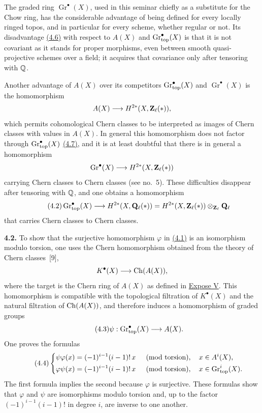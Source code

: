 The graded ring $\operatorname{Gr}^\bullet(X)$, used in this seminar chiefly
as a substitute for the Chow ring, has the considerable advantage of being
defined for every locally ringed topos, and in particular for every scheme,
whether regular or not. Its disadvantage \hyperlink{sga6.e14.para.4-6}{(4.6)} with respect to $A(X)$ and
$\operatorname{Gr}_{\mathrm{top}}^\bullet(X)$ is that it is not covariant as it stands for proper
morphisms, even between smooth quasi-projective schemes over a field; it
acquires that covariance only after tensoring with $\mathbb Q$.

Another advantage of $A(X)$ over its competitors $\operatorname{Gr}_{\mathrm{top}}^\bullet(X)$ and
$\operatorname{Gr}^\bullet(X)$ is the homomorphism
\[
 A(X)\longrightarrow H^{2*}(X,\mathbf Z_\ell(*)),
\]
which permits cohomological Chern classes to be interpreted as images of
Chern classes with values in $A(X)$. In general this homomorphism does not
factor through $\operatorname{Gr}_{\mathrm{top}}^\bullet(X)$ \hyperlink{sga6.e14.para.4-7}{(4.7)}, and it is at least doubtful that
there is in general a homomorphism
\[
 \operatorname{Gr}^\bullet(X)\longrightarrow H^{2*}(X,\mathbf Z_\ell(*))
\]
carrying Chern classes to Chern classes (see no.~5). These difficulties
disappear after tensoring with $\mathbb Q$, and one obtains a homomorphism
\begin{equation*}\tag{4.2}
 \operatorname{Gr}_{\mathrm{top}}^\bullet(X)\longrightarrow H^{2*}(X,\mathbf Q_\ell(*))
 =H^{2*}(X,\mathbf Z_\ell(*))\otimes_{\mathbf Z_\ell}\mathbf Q_\ell
\end{equation*}
that carries Chern classes to Chern classes.

\noindent{}\textbf{4.2.}
To show that the surjective homomorphism $\varphi$ in \hyperlink{sga6.e14.eq.4-1}{(4.1)} is an
isomorphism modulo torsion, one uses the Chern homomorphism obtained from the
theory of Chern classes~[9],
\[
 K^\bullet(X)\longrightarrow \operatorname{Ch}(A(X)),
\]
where the target is the Chern ring of $A(X)$ as defined in \hyperlink{sga6.e05.expose}{Expose V}. This
homomorphism is compatible with the topological filtration of $K^\bullet(X)$
and the natural filtration of $\operatorname{Ch}(A(X))$, and therefore induces a
homomorphism of graded groups
\begin{equation*}\tag{4.3}
 \psi:\operatorname{Gr}_{\mathrm{top}}^\bullet(X)\longrightarrow A(X).
\end{equation*}
One proves the formulas
\begin{equation*}\tag{4.4}
\left\{
\begin{aligned}
 \psi\varphi(x)&=(-1)^{i-1}(i-1)!\,x
   &&\pmod{\text{torsion}},\quad x\in A^i(X),\\
 \varphi\psi(x)&=(-1)^{i-1}(i-1)!\,x
   &&\pmod{\text{torsion}},\quad x\in \operatorname{Gr}_{\mathrm{top}}^i(X).
\end{aligned}
\right.
\end{equation*}
The first formula implies the second because $\varphi$ is surjective. These
formulas show that $\varphi$ and $\psi$ are isomorphisms modulo torsion and,
up to the factor $(-1)^{i-1}(i-1)!$ in degree $i$, are inverse to one
another.

